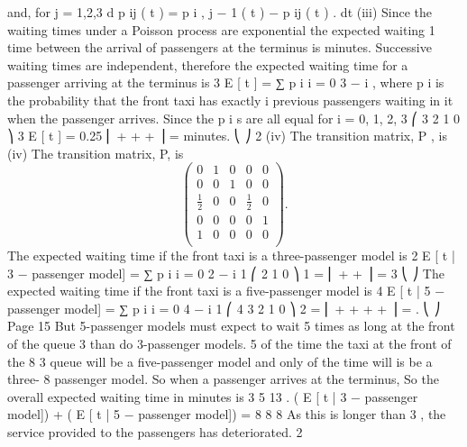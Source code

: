\documentclass[a4paper,12pt]{article}
\begin{document}
and, for j = 1,2,3
d
p ij ( t ) = \beta p i , j − 1 ( t ) − \beta p ij ( t ) .
dt
(iii)
Since the waiting times under a Poisson process are exponential the expected waiting
1
time between the arrival of passengers at the terminus is minutes.
\beta
Successive waiting times are independent, therefore the expected waiting time for a
passenger arriving at the terminus is
3
E [ t ] = ∑ p i
i = 0
3 − i
,
\beta
where p i is the probability that the front taxi has exactly i previous passengers waiting
in it when the passenger arrives.
Since the p i s are all equal for i = 0, 1, 2, 3
⎛ 3 2 1 0 ⎞ 3
E [ t ] = 0.25 ⎜ + + + ⎟ =
minutes.
⎝ \beta \beta \beta \beta ⎠ 2 \beta
(iv)
The transition matrix, P , is
(iv) The transition matrix, P, is
\[\begin{pmatrix}
0 & 1 & 0 & 0 & 0 \\
0 & 0 & 1 & 0 & 0 \\
\frac{1}{2} &  0 & 0 & \frac{1}{2} & 0\\
0 & 0 & 0 & 0 & 1 \\
1 & 0 & 0 &  0 & 0 \\
\end{pmatrix}.
\]
The expected waiting time if the front taxi is a three-passenger model is
2
E [ t | 3 − passenger model] = ∑ p i
i = 0
2 − i 1 ⎛ 2 1 0 ⎞ 1
= ⎜ + + ⎟ =
3 ⎝ \beta \beta \beta ⎠ \beta
\beta
The expected waiting time if the front taxi is a five-passenger model is
4
E [ t | 5 − passenger model] = ∑ p i
i = 0
4 − i 1 ⎛ 4 3 2 1 0 ⎞ 2
= ⎜ + + + + ⎟ = .
 ⎝ \beta \beta \beta \beta \beta ⎠ \beta
Page 15 %
But 5-passenger models must expect to wait
5
times as long at the front of the queue
3
than do 3-passenger models.
5
of the time the taxi at the front of the
8
3
queue will be a five-passenger model and only of the time will is be a three-
8
passenger model.
So when a passenger arrives at the terminus,
So the overall expected waiting time in minutes is
3
5
13
.
( E [ t | 3 − passenger model]) + ( E [ t | 5 − passenger model]) =
8
8
8 \beta
As this is longer than
3
, the service provided to the passengers has deteriorated.
2\beta

\end{document}
